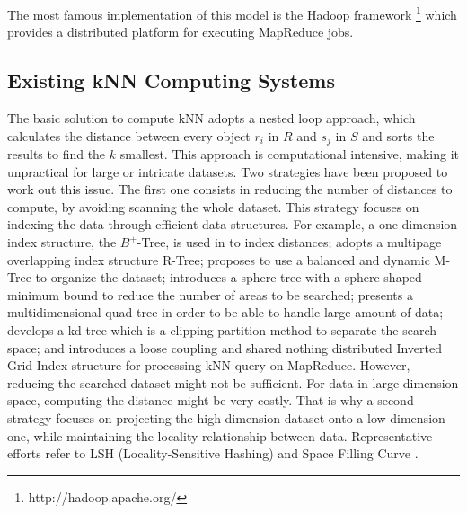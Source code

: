 \documentclass[10pt,journal,compsoc]{IEEEtran}
\newcommand{\TODO}[1]{\textcolor{red}{\textbf{[TODO:#1]}}}
\begin{document}
The most famous implementation
of this model is the Hadoop framework \footnote{http://hadoop.apache.org/} which provides a distributed platform for executing MapReduce jobs. 


\subsection{Existing kNN Computing Systems}
The basic solution to compute kNN adopts a nested loop approach, which calculates the distance between every object 
$r_i$ in $R$ and $s_j$ in $S$ and 
sorts the results to find the $k$ smallest. This approach is computational intensive, making it unpractical for large or intricate datasets. Two
strategies have been proposed to work out this issue.  
The first one consists in reducing the number of distances to compute, by avoiding scanning the whole dataset. This strategy focuses on indexing the 
data through efficient data structures. For example, a one-dimension index structure, the $B^+$-Tree, is used in \cite{DBLP:journals/tods/JagadishOTYZ05} to index distances; 
\cite{MuX} adopts a multipage overlapping index structure R-Tree; 
\cite{Ciaccia:1997:MEA:645923.671005} 
proposes to use a balanced and dynamic M-Tree to organize the dataset; \cite{Yu:2010:HKJ:1713160.1713227} introduces a sphere-tree with a sphere-shaped minimum bound to reduce the number of areas to be searched; \cite{Andreica13sequentialand} presents a multidimensional quad-tree in order to be able to handle large 
amount of data; \cite{Bentley:1975:MBS:361002.361007} develops a kd-tree which is a  clipping partition method to separate the search space; %
and \cite{Ji:2012:IGK:2408853.2408998} introduces a loose coupling and shared nothing distributed Inverted Grid Index 
structure for processing kNN query on MapReduce. 
However, reducing the searched dataset might not be sufficient. For data in large dimension space, computing the distance might 
be very costly. That is why a second strategy focuses on projecting the high-dimension dataset onto a low-dimension one, while maintaining the 
locality relationship between data. Representative efforts refer to LSH (Locality-Sensitive Hashing) \cite{DBLP:conf/compgeom/2004} and 
Space  Filling Curve \cite{5447837}.
\end{document}
